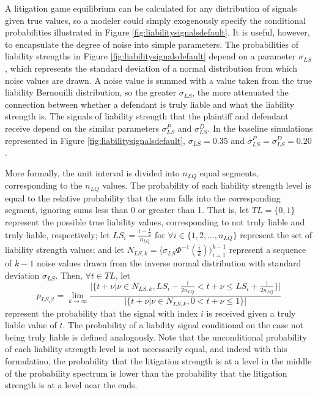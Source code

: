 \documentclass{article}
\begin{document}
A litigation game equilibrium can be calculated for any distribution of signals given true values, so a modeler could simply exogenously specify the conditional probabilities illustrated in Figure \ref{fig:liabilitysignalsdefault}. It is useful, however, to encapsulate the degree of noise into simple parameters. The probabilities of liability strengths in Figure \ref{fig:liabilitysignalsdefault} depend on a parameter $\sigma_{LS}$, which represents the standard deviation of a normal distribution from which noise values are drawn. A noise value is summed with a value taken from the true liability Bernouilli distribution, so the greater $\sigma_{LS}$, the more attenuated the connection between whether a defendant is truly liable and what the liability strength is. The signals of liability strength that the plaintiff and defendant receive depend on the similar parameters $\sigma_{LS}^P$ and $\sigma_{LS}^D$. In the baseline simulations represented in Figure \ref{fig:liabilitysignalsdefault}, $\sigma_{LS}=0.35$ and $\sigma_{LS}^P=\sigma_{LS}^D=0.20$.

More formally, the unit interval is divided into $n_{LQ}$ equal segments, corresponding to the $n_{LQ}$ values. The probability of each liability strength level is equal to the relative probability that the sum falls into the corresponding segment, ignoring sums less than 0 or greater than 1. That is, let $TL=\{0,1\}$ represent the possible true liability values, corresponding to not truly liable and truly liable, respectively; let $LS_i=\frac{i - \frac{1}{2} }{n_{LQ} }$ for $\forall i \in \{1,2,...,n_{LQ}\}$ represent the set of liability strength values; and let $N_{LS,k}=\langle\sigma_{LS}\Phi^{-1}(\frac{i}{k}) \rangle_{i=1}^{k-1}$ represent a sequence of $k-1$ noise values drawn from the inverse normal  distribution with standard deviation $\sigma_{LS}$. Then, $\forall t\in TL$, let 
\begin{equation} 
p_{LS_i|t} = \lim_{k\to\infty} \frac{\lvert\{t+\nu |\nu \in N_{LS,k}, LS_i - \frac{1}{2n_{LQ} }<t+\nu \leq LS_i + \frac{1}{2n_{LQ} }\}\rvert}{\lvert\{t+\nu |\nu \in N_{LS,k}, 0<t+\nu \leq 1 \}\rvert}
\end{equation}
represent the probability that the signal with index $i$ is received given a truly liable value of $t$. The probability of a liability signal conditional on the case not being truly liable is defined analogously. Note that the unconditional probability of each liability strength level is not necessarily equal, and indeed with this formulatino, the probability that the litigation strength is at a level in the middle of the probability spectrum is lower than the probability that the litigation strength is at a level near the ends.
\end{document}
